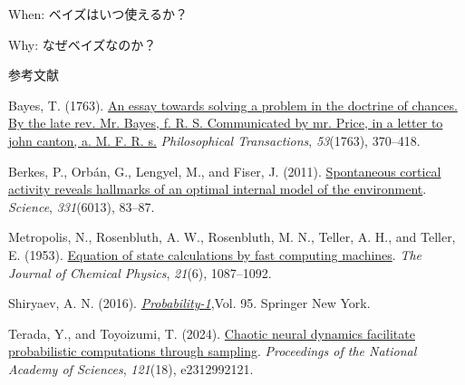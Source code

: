 \documentclass[
  ignorenonframetext,
]{beamer}
\newlength{\cslhangindent}
\newenvironment{CSLReferences}[2] %
 {\begin{list}{}{%
  \setlength{\itemindent}{0pt}
  \setlength{\leftmargin}{0pt}
  \setlength{\parsep}{0pt}
  \ifodd #1
   \setlength{\leftmargin}{\cslhangindent}
   \setlength{\itemindent}{-1\cslhangindent}
  \fi
  \setlength{\itemsep}{#2\baselineskip}}}
 {\end{list}}
\begin{document}
\begin{frame}{When: ベイズはいつ使えるか？}
\label{when-ux30d9ux30a4ux30baux306fux3044ux3064ux4f7fux3048ux308bux304b}
\end{frame}

\begin{frame}{Why: なぜベイズなのか？}
\label{why-ux306aux305cux30d9ux30a4ux30baux306aux306eux304b}
\end{frame}

\begin{frame}{参考文献}
\label{ux53c2ux8003ux6587ux732e}
\label{refs}
\begin{CSLReferences}{1}{1}
Bayes, T. (1763). \href{https://www.jstor.org/stable/105741}{An essay
towards solving a problem in the doctrine of chances. By the late rev.
Mr. Bayes, f. R. S. Communicated by mr. Price, in a letter to john
canton, a. M. F. R. s.} \emph{Philosophical Transactions},
\emph{53}(1763), 370--418.

Berkes, P., Orbán, G., Lengyel, M., and Fiser, J. (2011).
\href{https://doi.org/10.1126/science.1195870}{Spontaneous cortical
activity reveals hallmarks of an optimal internal model of the
environment}. \emph{Science}, \emph{331}(6013), 83--87.

Metropolis, N., Rosenbluth, A. W., Rosenbluth, M. N., Teller, A. H., and
Teller, E. (1953). \href{https://doi.org/10.1063/1.1699114}{Equation of
state calculations by fast computing machines}. \emph{The Journal of
Chemical Physics}, \emph{21}(6), 1087--1092.

Shiryaev, A. N. (2016).
\emph{\href{https://link.springer.com/book/10.1007/978-0-387-72206-1}{Probability-1}},Vol.
95. Springer New York.

Terada, Y., and Toyoizumi, T. (2024).
\href{https://doi.org/10.1073/pnas.2312992121}{Chaotic neural dynamics
facilitate probabilistic computations through sampling}.
\emph{Proceedings of the National Academy of Sciences}, \emph{121}(18),
e2312992121.

\end{CSLReferences}
\end{frame}
\end{document}

